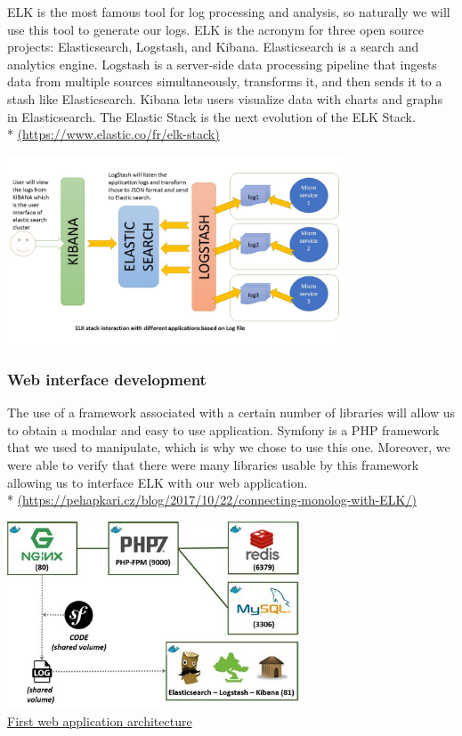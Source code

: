 ELK is the most famous tool for log processing and analysis, so naturally we will use this tool to generate our logs.
ELK is the acronym for three open source projects:
Elasticsearch, Logstash, and Kibana. Elasticsearch is a search and
analytics engine. Logstash is a server‑side data processing pipeline
that ingests data from multiple sources simultaneously, transforms it,
and then sends it to a stash like Elasticsearch. Kibana lets
users visualize data with charts and graphs in Elasticsearch. The
Elastic Stack is the next evolution of the ELK Stack.\\ *
\url{(https://www.elastic.co/fr/elk-stack)}\\
\begin{center}

\includegraphics[width=0.75\textwidth]{images/elk-example.jpg}

\end{center}

\subsubsection{Web interface development}

The use of a framework associated with a certain number of libraries will
allow us to obtain a modular and easy to use application.
Symfony is a PHP framework that we used to manipulate, which is why we chose 
to use this one. Moreover, we were able to verify that there were many 
libraries usable by this framework allowing us to interface ELK with our web
application. \\ *
\url{(https://pehapkari.cz/blog/2017/10/22/connecting-monolog-with-ELK/)}\\

\begin{center}

\includegraphics[width=0.65\textwidth]{images/symfony-example.jpg}
\\
\underline{First web application architecture}

\end{center}


